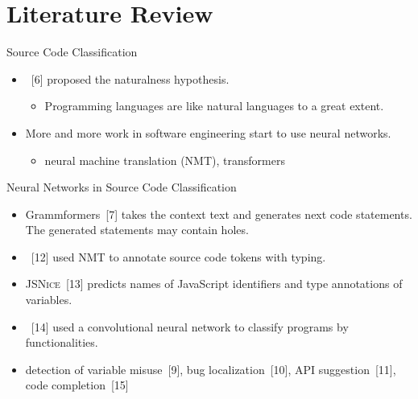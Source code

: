 \documentclass[xcolor=svgnames]{beamer}
\begin{document}
\section{Literature Review}
\begin{frame}{Source Code Classification}

\begin{itemize}
\item {}~[6] proposed the naturalness hypothesis.
\begin{itemize}
\item Programming languages are like natural languages to a great extent.
\end{itemize}

\item  More and more work in software engineering start to use neural networks.
\begin{itemize}
\item neural machine translation (NMT), transformers
\end{itemize}
\end{itemize}
\end{frame}

\begin{frame}{Neural Networks in Source Code Classification}


\begin{itemize}
\item  Grammformers~[7] takes the context text and generates next code statements. The generated statements may contain holes.

\item {}~[12] used NMT to annotate source code tokens with typing.

\item \textsc{JSNice}~[13] predicts names of JavaScript identifiers and type annotations of variables.

\item {}~[14] used a convolutional neural network to classify programs by functionalities.

\item detection of variable misuse~[9],
bug localization~[10],
API suggestion~[11],
code completion~[15]
\end{itemize}
\end{frame}
\end{document}
